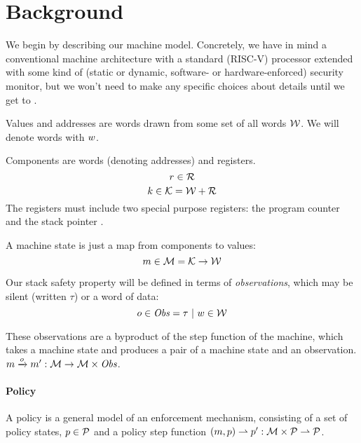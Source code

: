 \documentclass[acmsmall,review,anonymous]{acmart}\settopmatter{printfolios=true,printccs=false,printacmref=false}
\begin{document}
\section{Background}
\label{sec:prelim}

We begin by describing our machine model. Concretely, we have in mind a
conventional machine architecture with a standard (RISC-V) processor
extended with some kind of (static or dynamic, software- or
hardware-enforced) security monitor, but we won't need to make any
specific choices about details until we get to .

Values and addresses are words drawn from some set of all words ${\mathcal W}$. We will
denote words with $w$.

Components are words (denoting addresses) and registers.
%
    \[r \in {\mathcal R}\]
    \[k \in {\mathcal K} = {\mathcal W} + {\mathcal R} \]
%
The registers must include two special purpose registers: the program
counter \PCname and the stack pointer \SP.

A machine state is just a map from components to values:
%
\[m \in {\mathcal M} = {\mathcal K} \rightarrow {\mathcal W}\]


Our stack safety property will be defined in terms of {\em observations}, which may be
silent (written $\tau$) or a word of data:
%
\[o \in \mathit{Obs} = \tau ~ | ~ w \in {\mathcal W}\]

These observations are a byproduct of the step function of the
machine, which takes a machine state and produces a pair of a
machine state and an observation.
%
\(m \xrightarrow{o} m' : {\mathcal M} \rightarrow {\mathcal M} \times \mathit{Obs} \).

\paragraph*{Policy}

A policy is a general model of an enforcement mechanism, consisting of
a set of policy states, \(p \in \mathcal{P}\) and a policy step function
\((m, p) \rightharpoonup p' : {\mathcal M} \times \mathcal{P}
\rightharpoonup \mathcal{P}\).

\end{document}
